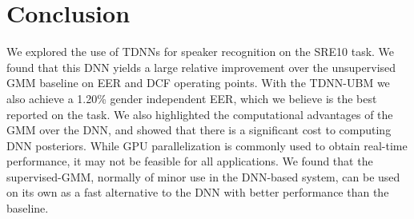 \documentclass{article}
\begin{document}
\section{Conclusion}

We explored the use of TDNNs for speaker recognition on the SRE10 task.
We found that this DNN yields a large relative improvement over the
unsupervised GMM baseline on EER and DCF operating points. With the
TDNN-UBM we also achieve a 1.20\% gender independent EER, 
which we believe is the best
reported on the task. We also highlighted the computational advantages
of the GMM over the DNN, and showed that there is a significant cost to
computing DNN posteriors. While GPU parallelization is commonly used to
obtain real-time performance, it may not be feasible for all applications.
We found that the supervised-GMM, normally
of minor use in the DNN-based system, can be 
used on its own as a fast alternative to the DNN with better performance
than the baseline. 



\end{document}
